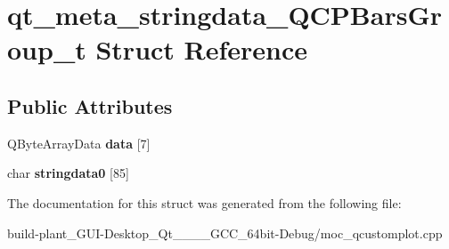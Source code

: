 \hypertarget{structqt__meta__stringdata__QCPBarsGroup__t}{}\section{qt\+\_\+meta\+\_\+stringdata\+\_\+\+Q\+C\+P\+Bars\+Group\+\_\+t Struct Reference}
\label{structqt__meta__stringdata__QCPBarsGroup__t}
\subsection*{Public Attributes}
\begin{DoxyCompactItemize}
\item 
\mbox{\label{structqt__meta__stringdata__QCPBarsGroup__t_a4af132fa7aa52aa1a2e32fed4547ee11}} 
Q\+Byte\+Array\+Data {\bfseries data} \mbox{[}7\mbox{]}
\item 
\mbox{\label{structqt__meta__stringdata__QCPBarsGroup__t_a2dd46435dea832cba9d6432a1b729650}} 
char {\bfseries stringdata0} \mbox{[}85\mbox{]}
\end{DoxyCompactItemize}


The documentation for this struct was generated from the following file\+:\begin{DoxyCompactItemize}
\item 
build-\/plant\+\_\+\+G\+U\+I-\/\+Desktop\+\_\+\+Qt\+\_\+\_\+\_\+\_\+\+G\+C\+C\+\_\+64bit-\/\+Debug/moc\+\_\+qcustomplot.\+cpp\end{DoxyCompactItemize}
